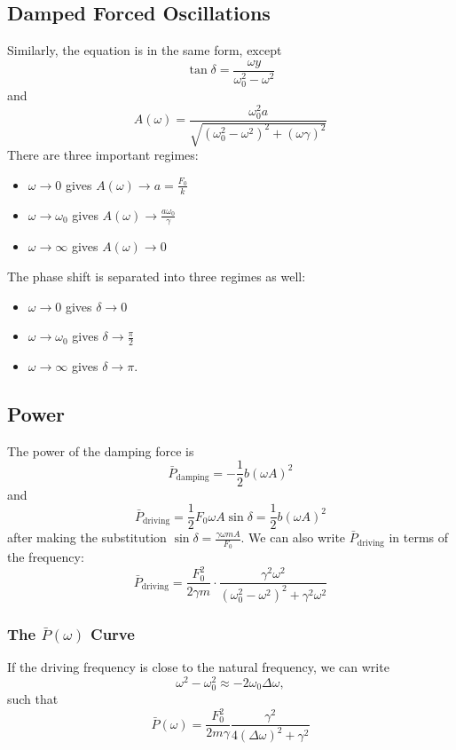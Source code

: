 \documentclass{article}
\begin{document}
\subsection{Damped Forced Oscillations}
Similarly, the equation is in the same form, except 
\begin{equation}
    \tan\delta = \frac{\omega y}{\omega_0^2-\omega^2}
\end{equation}
and 
\begin{equation}
    A(\omega) = \frac{\omega_0^2 a}{\sqrt{(\omega_0^2-\omega^2)^2 + (\omega \gamma)^2}}
\end{equation}
There are three important regimes: 
\begin{itemize}
    \item $\omega \to 0$ gives $A(\omega) \rightarrow a = \frac{F_0}{k}$
    \item $\omega \to \omega_0$ gives $A(\omega) \to \frac{a\omega_0}{\gamma}$
    \item $\omega\to\infty$ gives $A(\omega)\to 0$
\end{itemize}
The phase shift is separated into three regimes as well: 
\begin{itemize}
    \item $\omega \to 0$ gives $\delta \to 0$
    \item $\omega \to \omega_0$ gives $\delta \to \frac{\pi}{2}$
    \item $\omega\to\infty$ gives $\delta \to \pi$.
\end{itemize}

\subsection{Power}
The power of the damping force is
\begin{equation}
    \bar{P}_\text{damping}=-\frac{1}{2}b(\omega A)^2
\end{equation}
and 
\begin{equation}
    \bar{P}_\text{driving}=\frac{1}{2}F_0\omega A\sin\delta = \frac{1}{2}b(\omega A)^2 
\end{equation}
after making the substitution $\sin\delta = \frac{\gamma \omega m A}{F_0}.$ We can also write $\bar{P}_\text{driving}$ in terms of the frequency: 
\begin{equation}
    \bar{P}_\text{driving} = \frac{F_0^2}{2\gamma m}\cdot \frac{\gamma^2\omega^2}{(\omega_0^2-\omega^2)^2+\gamma^2\omega^2}
\end{equation}
\subsubsection{The $\bar{P}(\omega)$ Curve}
If the driving frequency is close to the natural frequency, we can write 
\begin{equation}
    \omega^2-\omega_0^2 \approx -2\omega_0\Delta \omega,
\end{equation}
such that 
\begin{equation}
    \bar{P}(\omega) = \frac{F_0^2}{2m\gamma} \frac{\gamma^2}{4(\Delta \omega)^2+\gamma^2}
\end{equation}
\end{document}
